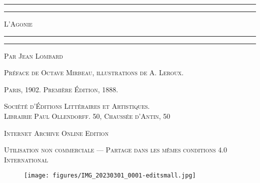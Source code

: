 \documentclass[a4paper, 11pt, oneside, polutonikogreek, french]{article}
\begin{document}
\begin{titlepage} %
	\centering %

	
	\rule{\textwidth}{1.6pt}\vspace*{-\baselineskip}\vspace*{2pt} %
	\rule{\textwidth}{0.4pt} %
	
	\vspace{1\baselineskip} %
	
	{\scshape\Huge L'Agonie}
	
	\vspace{1\baselineskip} %

	\rule{\textwidth}{0.4pt}\vspace*{-\baselineskip}\vspace{3.2pt} %
	\rule{\textwidth}{1.6pt} %
	
	\vspace{1\baselineskip} %
	
	
	{\scshape\Large Par Jean Lombard} %
	
	\vspace*{1\baselineskip} %
	
        {\scshape Préface de Octave Mirbeau, illustrations de A. Leroux.} %
    
        \vspace*{\fill}

	\vspace{1\baselineskip}

	{\small\scshape Paris, 1902. Première Édition, 1888.}
	
	{\small\scshape{Société d'Éditions Littéraires et Artistiques.\\ Librairie Paul Ollendorff. 50, Chaussée d'Antin, 50}}
	
	\vspace{0.5\baselineskip} %

        \scshape Internet Archive Online Edition  %
	
	{\scshape\small Utilisation non commerciale --- Partage dans les mêmes conditions 4.0 International} %
\end{titlepage}
\setlength{\parskip}{1mm plus1mm minus1mm}
\clearpage
\begin{figure}[H]
\centering
\texttt{[image: figures/IMG\_20230301\_0001-editsmall.jpg]}
\end{figure}
\clearpage
\tableofcontents
\clearpage
\end{document}
